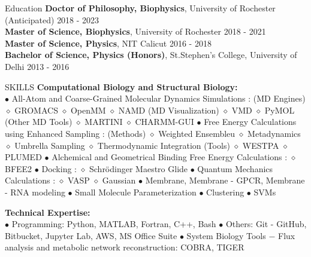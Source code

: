 \documentclass{resume} %
\begin{document}

\begin{rSection}{Education}
    {\bf Doctor of Philosophy, Biophysics}, University of Rochester (Anticipated) \hfill {2018 - 2023}\\
    {\bf Master of Science, Biophysics}, University of Rochester \hfill {2018 - 2021}\\
    {\bf Master of Science, Physics}, NIT Calicut \hfill {2016 - 2018}\\
    {\bf Bachelor of Science, Physics (Honors)}, St.Stephen's College, University of Delhi \hfill {2013 - 2016}


\end{rSection}


\begin{rSection}{SKILLS}
        {\bf Computational Biology and Structural Biology:} \\
        $\bullet$ All-Atom and Coarse-Grained Molecular Dynamics Simulations : 
        (MD Engines)   \textsf{$\diamond$ GROMACS $\diamond$ OpenMM $\diamond$ NAMD}
        (MD Visualization)  \textsf{$\diamond$ VMD $\diamond$ PyMOL}
        (Other MD Tools) \textsf{$\diamond$ MARTINI $\diamond$ CHARMM-GUI}
        $\bullet$ Free Energy Calculations using Enhanced Sampling :
        (Methods) $\diamond$ Weighted Ensembleu $\diamond$ Metadynamics $\diamond$ Umbrella Sampling $\diamond$ Thermodynamic Integration
        (Tools) \textsf{$\diamond$ WESTPA $\diamond$ PLUMED}
        $\bullet$ Alchemical and Geometrical Binding Free Energy Calculations :
        $\diamond$ \textsf{BFEE2}
        $\bullet$ Docking : 
        $\diamond$ \textsf{Schrödinger Maestro Glide}
        $\bullet$ Quantum Mechanics Calculations : 
        \textsf{$\diamond$ VASP $\diamond$ Gaussian}
        $\bullet$ Membrane, Membrane - GPCR, Membrane - RNA modeling $\bullet$ Small Molecule Parameterization  $\bullet$ Clustering $\bullet$ SVMs

        {\bf Technical Expertise:} \\
        $\bullet$ Programming: \textsf{Python, MATLAB, Fortran, C++, Bash} $\bullet$
        Others: \textsf{Git - GitHub, Bitbucket, Jupyter Lab, AWS, MS Office Suite} $\bullet$
        System Biology Tools $-$  Flux analysis and metabolic network reconstruction: \textsf{COBRA, TIGER}

\end{rSection}
\end{document}

